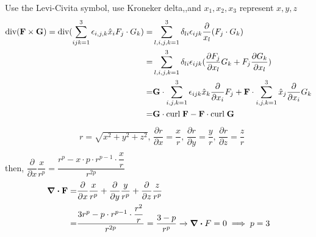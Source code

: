 \documentclass[12pt, a4paper]{article}
\begin{document}
\begin{CJK*}{UTF8}{bsmi}
Use the Levi-Civita symbol, use Kroneker delta,,and $x_1, x_2, x_3$ represent $x,y,z$ 
\begin{align}
    \text{div}(\textbf{F}\times\textbf{G})= \text{div}(\sum_{ijk=1}^{3}\epsilon_{i,j,k}\hat{x}_i F_j \cdot G_k)=&\sum_{l,i,j,k=1}^{3}\delta_{li} \epsilon_{ijk}\dfrac{\partial}{x_l}(F_j\cdot G_k)\\
     =&\sum_{l,i,j,k=1}^3 \delta_{li}\epsilon_{ijk}(\dfrac{\partial F_j}{\partial x_l}G_k+F_j\dfrac{\partial G_k}{\partial x_l})\\
     =&\textbf{G}\cdot \sum_{i,j,k=1}^3 \epsilon_{ijk}\hat{x}_k\dfrac{\partial}{\partial x_i}F_j+\textbf{F}\cdot \sum_{i,j,k=1}^3 \hat{x}_j \dfrac{\partial}{\partial x_i}G_k\\
     =&\textbf{G}\cdot \text{curl}\;\textbf F - \textbf F \cdot \text{curl}\;\textbf G
\end{align}
\begin{align}
    &r =\sqrt{x^2+y^2+z^2},\,\dfrac{\partial r}{\partial x} = \dfrac{x}{r},\,\dfrac{\partial r}{\partial y} = \dfrac{y}{r},\,\dfrac{\partial r}{\partial z} = \dfrac{z}{r}\\ 
\end{align}
then, $\dfrac{\partial}{\partial x}\dfrac{x}{r^p}=\dfrac{r^p-x\cdot p\cdot r^{p-1}\cdot \dfrac{x}{r}}{r^{2p}}$
\begin{align}
    \div{\textbf F} =& \dfrac{\partial}{\partial x} \dfrac{x}{r^p}+\dfrac{\partial}{\partial y}\dfrac{y}{r^p}+\dfrac{\partial}{\partial z}\dfrac{z}{r^p}\\
    =& \dfrac{3r^p-p\cdot r^{p-1}\cdot \dfrac{r^2}{r}}{r^{2p}}=\dfrac{3-p}{r^p}\xrightarrow{} \div{F}=0 \implies p=3 
\end{align}


\end{CJK*}
\end{document}

